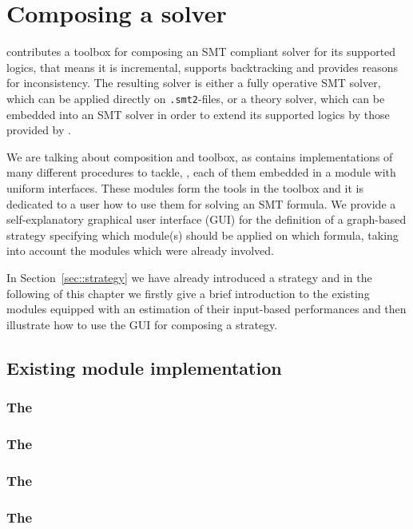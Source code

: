 \chapter{Composing a solver}
\label{chapter:composingats}
\smtrat contributes a toolbox for composing an SMT compliant solver for its supported logics, that means it is incremental, supports backtracking and provides reasons for inconsistency. The resulting
solver is either a fully operative SMT solver, which can be applied
directly on \texttt{.smt2}-files, or a theory solver, which can be embedded into an SMT 
solver in order to extend its supported logics by those provided by \smtrat.

We are talking about composition and toolbox, as \smtrat contains implementations
of many different procedures to tackle, \eg \supportedLogics, each of them
embedded in a module with uniform interfaces. These modules form the tools in the toolbox
and it is dedicated to a user how to use them for solving an SMT formula.
We provide a self-explanatory graphical user interface (GUI) for the definition of a graph-based 
strategy specifying which module(s) should be applied on which formula, 
taking into account the modules which were already involved.

In Section~\ref{sec::strategy} we have already introduced
a strategy and in the following of this chapter we firstly give a brief introduction 
to the existing modules equipped with an estimation of their input-based performances and then illustrate
how to use the GUI for composing a strategy.

\section{Existing module implementation}
\subsection{The \cnferModuleClass}

\subsection{The \satModuleClass}

\subsection{The \lraModuleClass}

\subsection{The \icpModuleClass}

